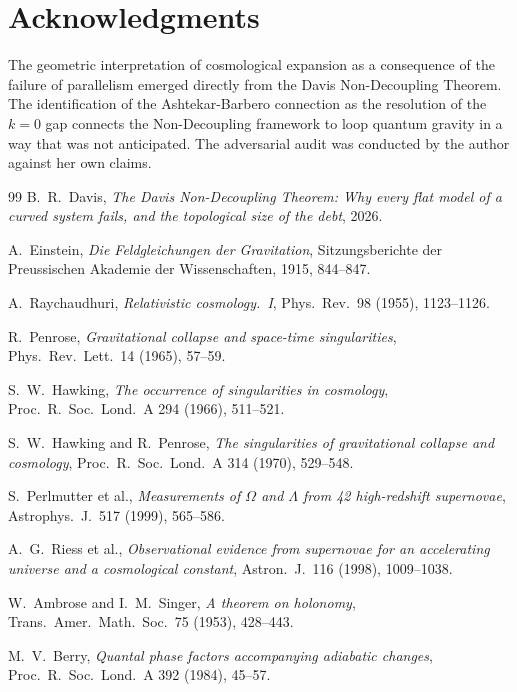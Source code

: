 \documentclass[12pt]{amsart}
\theoremstyle{definition}
\begin{document}
\section*{Acknowledgments}

The geometric interpretation of cosmological expansion as a consequence of the failure of parallelism emerged directly from the Davis Non-Decoupling Theorem.  The identification of the Ashtekar-Barbero connection as the resolution of the $k = 0$ gap connects the Non-Decoupling framework to loop quantum gravity in a way that was not anticipated.  The adversarial audit was conducted by the author against her own claims.

\begin{thebibliography}{99}
 B.~R.~Davis, \emph{The Davis Non-Decoupling Theorem: Why every flat model of a curved system fails, and the topological size of the debt}, 2026.

 A.~Einstein, \emph{Die Feldgleichungen der Gravitation}, Sitzungsberichte der Preussischen Akademie der Wissenschaften, 1915, 844--847.

 A.~Raychaudhuri, \emph{Relativistic cosmology.\ I}, Phys.\ Rev.\ 98 (1955), 1123--1126.

 R.~Penrose, \emph{Gravitational collapse and space-time singularities}, Phys.\ Rev.\ Lett.\ 14 (1965), 57--59.

 S.~W.~Hawking, \emph{The occurrence of singularities in cosmology}, Proc.\ R.\ Soc.\ Lond.\ A 294 (1966), 511--521.

 S.~W.~Hawking and R.~Penrose, \emph{The singularities of gravitational collapse and cosmology}, Proc.\ R.\ Soc.\ Lond.\ A 314 (1970), 529--548.

 S.~Perlmutter et al., \emph{Measurements of $\Omega$ and $\Lambda$ from 42 high-redshift supernovae}, Astrophys.\ J.\ 517 (1999), 565--586.

 A.~G.~Riess et al., \emph{Observational evidence from supernovae for an accelerating universe and a cosmological constant}, Astron.\ J.\ 116 (1998), 1009--1038.

 W.~Ambrose and I.~M.~Singer, \emph{A theorem on holonomy}, Trans.\ Amer.\ Math.\ Soc.\ 75 (1953), 428--443.

 M.~V.~Berry, \emph{Quantal phase factors accompanying adiabatic changes}, Proc.\ R.\ Soc.\ Lond.\ A 392 (1984), 45--57.


\end{thebibliography}
\end{document}
